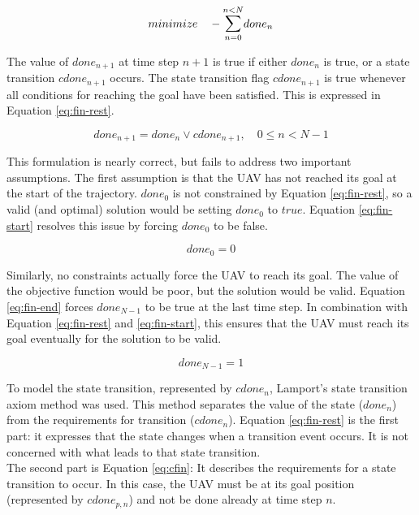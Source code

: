 \begin{equation}
\label{eq:goal-fun}
minimize \quad - \mathlarger{\sum}_{n=0}^{n < N} done_n
\end{equation}

The value of $done_{n+1}$ at time step $n + 1$ is true if either $done_n$ is true, or a state transition $cdone_{n+1}$ occurs. The state transition flag $cdone_{n+1}$ is true whenever all conditions for reaching the goal have been satisfied. This is expressed in Equation \ref{eq:fin-rest}.

\begin{equation}
\label{eq:fin-rest}
done_{n+1} = done_n \vee cdone_{n+1},  \quad 0 \leq n < N  - 1
\end{equation}

This formulation is nearly correct, but fails to address two important assumptions. The first assumption is that the UAV has not reached its goal at the start of the trajectory. $done_0$ is not constrained by Equation \ref{eq:fin-rest}, so a valid (and optimal) solution would be setting $done_0$ to $true$. Equation \ref{eq:fin-start} resolves this issue by forcing $done_0$ to be false.

\begin{equation}
\label{eq:fin-start}
done_0 = 0
\end{equation}

Similarly, no constraints actually force the UAV to reach its goal. The value of the objective function would be poor, but the solution would be valid. Equation \ref{eq:fin-end} forces $done_{N-1}$ to be true at the last time step. In combination with Equation \ref{eq:fin-rest} and \ref{eq:fin-start}, this ensures that the UAV must reach its goal eventually for the solution to be valid.

\begin{equation}
\label{eq:fin-end}
done_{N - 1} = 1
\end{equation}

To model the state transition, represented by $cdone_{n}$, Lamport's \cite{Lamport1989} state transition axiom method was used. This method separates the value of the state ($done_{n}$) from the requirements for transition ($cdone_{n}$). Equation \ref{eq:fin-rest} is the first part: it expresses that the state changes when a transition event occurs. It is not concerned with what leads to that state transition. \\
The second part is Equation \ref{eq:cfin}: It describes the requirements for a state transition to occur. In this case, the UAV must be at its goal position (represented by $cdone_{p,n}$) and not be done already at time step $n$.

